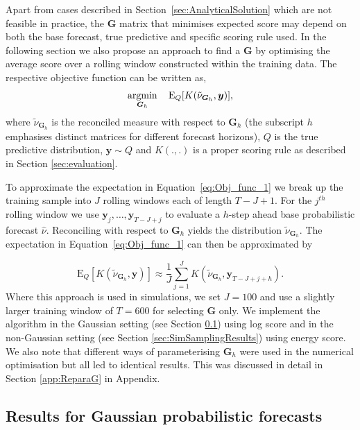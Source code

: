 \documentclass[12pt]{article}
\def\E{\text{E}}
\theoremstyle{definition}
\begin{document}
Apart from cases described in Section~\ref{sec:AnalyticalSolution} which are not feasible in practice, the $\bm{G}$ matrix that minimises expected score may depend on both the base forecast, true predictive and specific scoring rule used.  In the following section we also propose an approach to find a $\bm{G}$ by optimising the average score over a rolling window constructed within the training data.  The respective objective function can be written as,
\begin{equation} \label{eq:Obj_func_1}
\operatornamewithlimits{argmin}_{\bm{G}_h} \quad \E_{Q}[K(\tilde{\nu}_{\bm{G}_h}, \bm{y})],
\end{equation}
where $\tilde{\nu}_{\bm{G}_h}$ is the reconciled measure with respect to $\bm{G}_h$ (the subscript $h$ emphasises distinct matrices for different forecast horizons), $Q$ is the true predictive distribution, $\bm{y}\sim Q$ and $K(.,.)$ is a proper scoring rule as described in Section \ref{sec:evaluation}.

To approximate the expectation in Equation~\eqref{eq:Obj_func_1} we break up the training sample into $J$ rolling windows each of length $T-J+1$.  For the $j^{th}$ rolling window we use $\bm{y}_{j},\ldots,\bm{y}_{T-J+j}$ to evaluate a $h$-step ahead base probabilistic forecast $\hat{\nu}$.  Reconciling with respect to $\bm{G}_h$ yields the distribution $\tilde{\nu}_{\bm{G}_h}$.  The expectation in Equation~\eqref{eq:Obj_func_1} can then be approximated by

\begin{equation} \label{eq:Obj_func_apprx} \E_{Q}[K(\tilde{\nu}_{\bm{G}_h}, \bm{y})]\approx\frac{1}{J}\sum_{j=1}^{J}K(\tilde{\nu}_{\bm{G}_h},\bm{y}_{T-J+j+h}).\nonumber
\end{equation}
Where this approach is used in simulations, we set $J=100$ and use a slightly larger training window of $T=600$ for selecting $\bm{G}$ only. We implement the algorithm in the Gaussian setting (see Section \ref{sec:SimAnalysticalResults}) using log score and in the non-Gaussian setting (see Section \ref{sec:SimSamplingResults}) using energy score.  We also note that different ways of parameterising $\bm{G}_h$ were used in the numerical optimisation but all led to identical results.  This was discussed in detail in Section \ref{app:ReparaG} in Appendix.

\subsection{Results for Gaussian probabilistic forecasts}\label{sec:SimAnalysticalResults}
\end{document}

